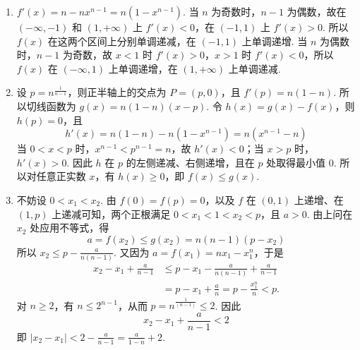 \begin{solution}
\begin{enumerate}
\item \(f'(x)=n-nx^{n-1}=n(1-x^{n-1})\). 当 \(n\) 为奇数时，\(n-1\) 为偶数，故在 \((-\infty,-1)\) 和 \((1,+\infty)\) 上 \(f'(x)<0\)，在 \((-1,1)\) 上 \(f'(x)>0\). 所以 \(f(x)\) 在这两个区间上分别单调递减，在 \((-1,1)\) 上单调递增. 当 \(n\) 为偶数时，\(n-1\) 为奇数，故 \(x<1\) 时 \(f'(x)>0\)，\(x>1\) 时 \(f'(x)<0\)，所以 \(f(x)\) 在 \((-\infty,1)\) 上单调递增，在 \((1,+\infty)\) 上单调递减.
\item 设 \(p=n^{\frac1{n-1}}\)，则正半轴上的交点为 \(P=(p,0)\)，且 \(f'(p)=n(1-n)\). 所以切线函数为 \(g(x)=n(1-n)(x-p)\). 令 \(h(x)=g(x)-f(x)\)，则 \(h(p)=0\)，且
\[
h'(x)=n(1-n)-n(1-x^{n-1})=n(x^{n-1}-n)
\]
当 \(0<x<p\) 时，\(x^{n-1}<p^{n-1}=n\)，故 \(h'(x)<0\)；当 \(x>p\) 时，\(h'(x)>0\). 因此 \(h\) 在 \(p\) 的左侧递减、右侧递增，且在 \(p\) 处取得最小值 \(0\). 所以对任意正实数 \(x\)，有 \(h(x)\geqslant0\)，即 \(f(x)\leqslant g(x)\).
\item 不妨设 \(0<x_1<x_2\). 由 \(f(0)=f(p)=0\)，以及 \(f\) 在 \((0,1)\) 上递增、在 \((1,p)\) 上递减可知，两个正根满足 \(0<x_1<1<x_2<p\)，且 \(a>0\). 由上问在 \(x_2\) 处应用不等式，得
\[
a=f(x_2)\leqslant g(x_2)=n(n-1)(p-x_2)
\]
所以 \(x_2\leqslant p-\frac{a}{n(n-1)}\). 又因为 \(a=f(x_1)=nx_1-x_1^n\)，于是
\[
\begin{aligned}
x_2-x_1+\frac{a}{n-1}
&\leqslant p-x_1-\frac{a}{n(n-1)}+\frac{a}{n-1}\\
&=p-x_1+\frac an
=p-\frac{x_1^n}{n}<p.
\end{aligned}
\]
对 \(n\geqslant2\)，有 \(n\leqslant2^{n-1}\)，从而 \(p=n^{\frac{1}{(n-1)}}\leqslant2\). 因此
\[
x_2-x_1+\frac{a}{n-1}<2
\]
即 \(|x_2-x_1|<2-\frac{a}{n-1}=\frac{a}{1-n}+2\).
\end{enumerate}
\end{solution}
